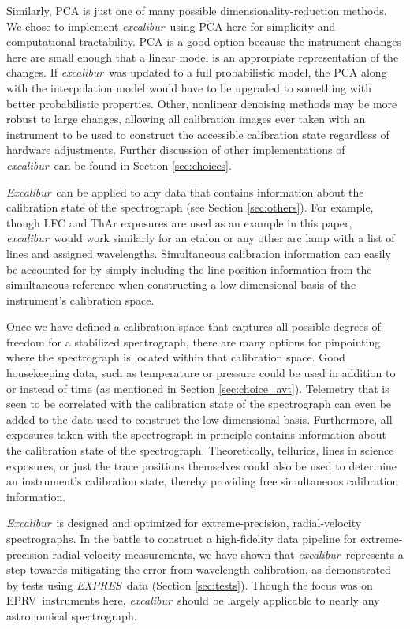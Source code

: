 \documentclass[twocolumn,table,xcolor,trackchanges]{aastex63}
\newcommand{\project}[1]{\textsl{#1}}
\newcommand{\name}{\project{excalibur}}
\newcommand{\Name}{\project{Excalibur}}
\newcommand{\acronym}[1]{{\small{#1}}}
\newcommand{\expres}{\project{\acronym{EXPRES}}}
\newcommand{\eprv}{\acronym{EPRV}}
\begin{document}
Similarly, PCA is just one of many possible dimensionality-reduction methods.  We chose to implement \name\ using PCA here for simplicity and computational tractability.  PCA is a good option because the instrument changes here are small enough that a linear model is an approrpiate representation of the changes.  If \name\ was updated to a full probabilistic model, the PCA along with the interpolation model would have to be upgraded to something with better probabilistic properties.  Other, nonlinear denoising methods may be more robust to large changes, allowing all calibration images ever taken with an instrument to be used to construct the accessible calibration state regardless of hardware adjustments.  Further discussion of other implementations of \name\ can be found in Section \ref{sec:choices}.

\Name\ can be applied to any data that contains information about the calibration state of the spectrograph (see Section \ref{sec:others}).  For example, though LFC and ThAr exposures are used as an example in this paper, \name\ would work similarly for an etalon or any other arc lamp with a list of lines and assigned wavelengths.  Simultaneous calibration information can easily be accounted for by simply including the line position information from the simultaneous reference when constructing a low-dimensional basis of the instrument's calibration space.

Once we have defined a calibration space that captures all possible degrees of freedom for a stabilized spectrograph, there are many options for pinpointing where the spectrograph is located within that calibration space.  Good housekeeping data, such as temperature or pressure could be used in addition to or instead of time (as mentioned in Section \ref{sec:choice_avt}).  Telemetry that is seen to be correlated with the calibration state of the spectrograph can even be added to the data used to construct the low-dimensional basis.  Furthermore, all exposures taken with the spectrograph in principle contains information about the calibration state of the spectrograph.  Theoretically, tellurics, lines in science exposures, or just the trace positions themselves could also be used to determine an instrument's calibration state, thereby providing free simultaneous calibration information.

\Name\ is designed and optimized for extreme-precision, radial-velocity spectrographs.  In the battle to construct a high-fidelity data pipeline for extreme-precision radial-velocity measurements, we have shown that \name\ represents a step towards mitigating the error from wavelength calibration, as demonstrated by tests using \expres\ data (Section \ref{sec:tests}).  Though the focus was on \eprv\ instruments here, \name\ should be largely applicable to nearly any astronomical spectrograph.
\end{document}
